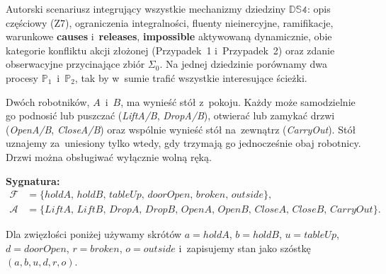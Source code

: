 \documentclass[11pt,a4paper]{article}
\newcommand{\causes}{\textbf{causes}}
\newcommand{\impossible}{\textbf{impossible}}
\newcommand{\releases}{\textbf{releases}}
\theoremstyle{definition}
\begin{document}
\noindent Autorski scenariusz integrujący wszystkie mechanizmy
dziedziny $\mathbb{DS4}$: opis częściowy (Z7), ograniczenia integralności,
fluenty nieinercyjne, ramifikacje, warunkowe \causes{} i~\releases{},
\impossible{} aktywowaną dynamicznie, obie kategorie konfliktu akcji
złożonej (Przypadek~1 i~Przypadek~2) oraz zdanie obserwacyjne przycinające
zbiór $\Sigma_0$. Na jednej dziedzinie porównamy dwa procesy $\mathbb{P}_1$~i~$\mathbb{P}_2$,
tak by w~sumie trafić wszystkie interesujące ścieżki.

Dwóch robotników, $A$~i~$B$, ma wynieść stół z~pokoju. Każdy może
samodzielnie go podnosić lub puszczać (\textit{LiftA/B}, \textit{DropA/B}),
otwierać lub zamykać drzwi (\textit{OpenA/B}, \textit{CloseA/B}) oraz
wspólnie wynieść stół na~zewnątrz (\textit{CarryOut}). Stół uznajemy
za~uniesiony tylko wtedy, gdy trzymają go jednocześnie obaj robotnicy.
Drzwi można obsługiwać wyłącznie wolną ręką.

\medskip
\noindent\textbf{Sygnatura:}
\begin{align*}
  \mathcal{F} &= \{\mathit{holdA},\, \mathit{holdB},\, \mathit{tableUp},\,
                   \mathit{doorOpen},\, \mathit{broken},\, \mathit{outside}\}, \\
  \mathcal{A} &= \{\mathit{LiftA},\, \mathit{LiftB},\, \mathit{DropA},\, \mathit{DropB},\,
                   \mathit{OpenA},\, \mathit{OpenB},\, \mathit{CloseA},\, \mathit{CloseB},\,
                   \mathit{CarryOut}\}.
\end{align*}

\smallskip\noindent
Dla zwięzłości poniżej używamy skrótów
$a = \mathit{holdA}$, $b = \mathit{holdB}$, $u = \mathit{tableUp}$,
$d = \mathit{doorOpen}$, $r = \mathit{broken}$, $o = \mathit{outside}$
i~zapisujemy stan jako szóstkę $(a,b,u,d,r,o)$.
\end{document}
